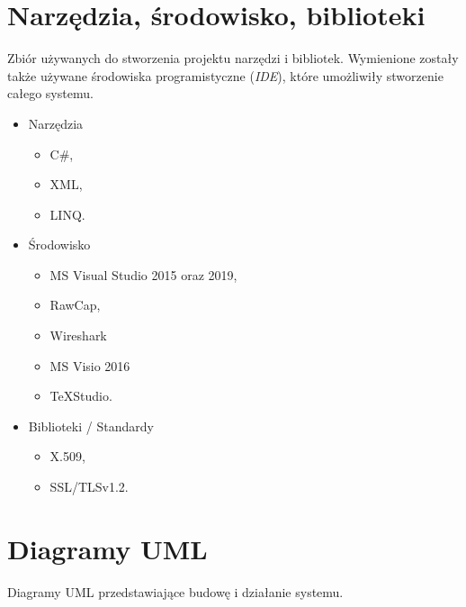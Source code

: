 \documentclass[12pt,a4paper]{article}
\begin{document}
	\section{Narzędzia, środowisko, biblioteki}
	\par Zbiór używanych do stworzenia projektu narzędzi i bibliotek. Wymienione zostały także używane środowiska programistyczne (\textit{IDE}), które umożliwiły stworzenie całego systemu. 
	\begin{itemize}
		\item Narzędzia
		\begin{itemize}
			\item C\#,
			\item XML,
			\item LINQ.
		\end{itemize}
	
		\item Środowisko
		\begin{itemize}
			\item MS Visual Studio 2015 oraz 2019,
			\item RawCap,
			\item Wireshark
			\item MS Visio 2016 
			\item TeXStudio.
		\end{itemize}
	
		\item Biblioteki / Standardy
		\begin{itemize}
			\item X.509,
			\item SSL/TLSv1.2.
		\end{itemize}
	\end{itemize}
	
	\newpage
	\section{Diagramy UML}
	
	Diagramy UML przedstawiające budowę i działanie systemu.
\end{document}
